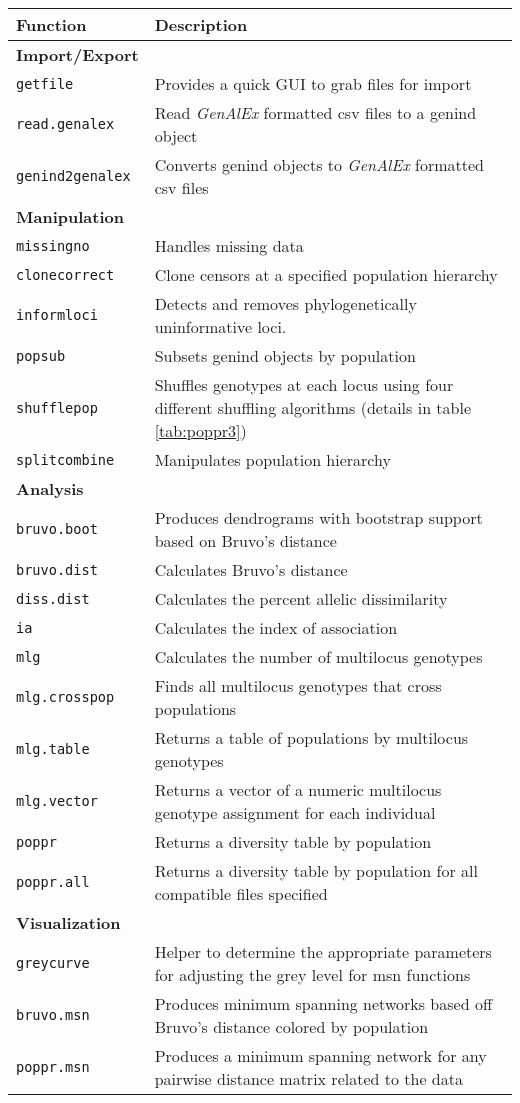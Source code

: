 \begin{sidewaystable}[ph!]
\begin{tabular}{ll}
\hline
Function & Description \\ 
\hline
\textbf{Import/Export} & \\
\texttt{getfile} & Provides a quick GUI to grab files for import \\
\texttt{read.genalex} & Read \textit{GenAlEx} formatted csv files to a genind object \\
\texttt{genind2genalex} & Converts genind objects to \textit{GenAlEx} formatted csv files \\
\hline
\textbf{Manipulation} & \\
\texttt{missingno} & Handles missing data \\
\texttt{clonecorrect} & Clone censors at a specified population hierarchy \\
\texttt{informloci} & Detects and removes phylogenetically uninformative loci. \\
\texttt{popsub} & Subsets genind objects by population \\
\texttt{shufflepop} & Shuffles genotypes at each locus using four different shuffling algorithms (details in table \ref{tab:poppr3}) \\
\texttt{splitcombine} & Manipulates population hierarchy \\ 
\hline
\textbf{Analysis} & \\
\texttt{bruvo.boot} & Produces dendrograms with bootstrap support based on Bruvo's distance \\
\texttt{bruvo.dist} & Calculates Bruvo's distance \\
\texttt{diss.dist} & Calculates the percent allelic dissimilarity \\
\texttt{ia} & Calculates the index of association \\
\texttt{mlg} & Calculates the number of multilocus genotypes \\
\texttt{mlg.crosspop} & Finds all multilocus genotypes that cross populations \\
\texttt{mlg.table} & Returns a table of populations by multilocus genotypes \\
\texttt{mlg.vector} & Returns a vector of a numeric multilocus genotype assignment for each individual \\
\texttt{poppr} & Returns a diversity table by population \\
\texttt{poppr.all} & Returns a diversity table by population for all compatible files specified \\
\hline
\textbf{Visualization} & \\
\texttt{greycurve} & Helper to determine the appropriate parameters for adjusting the grey level for msn functions \\
\texttt{bruvo.msn} & Produces minimum spanning networks based off Bruvo's distance colored by population \\
\texttt{poppr.msn} & Produces a minimum spanning network for any pairwise distance matrix related to the data \\
\hline


\end{tabular}
\end{sidewaystable}
